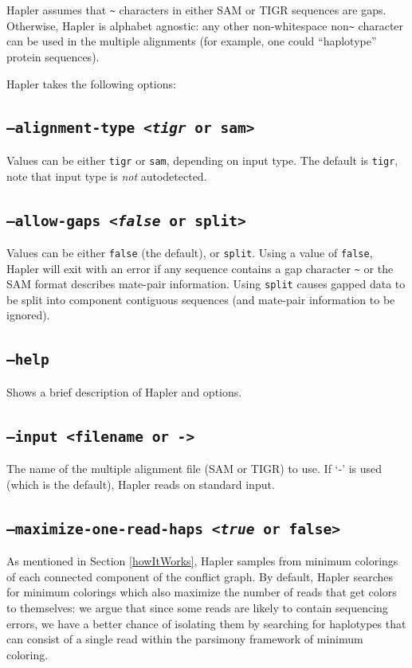 \documentclass[11pt]{llncs}
\begin{document}
Hapler assumes that \verb=~= characters in either SAM or TIGR sequences are gaps. Otherwise, Hapler is alphabet agnostic: any other non-whitespace
non\verb=~= character can be used in the multiple alignments (for example, one could ``haplotype'' protein sequences). 

Hapler takes the following options:

\subsection{\texttt{--alignment-type <\emph{tigr} or sam>}}

Values can be either \verb=tigr= or \verb=sam=, depending on input type. The default is \verb=tigr=, note that input type is \emph{not}
autodetected.

\subsection{\texttt{--allow-gaps <\emph{false} or split>}}

Values can be either \verb=false= (the default), or \verb=split=. Using a value of \verb=false=, Hapler will exit with an error
if any sequence contains a gap character \verb=~= or the SAM format describes mate-pair information. Using \verb=split= causes gapped data
to be split into component contiguous sequences (and mate-pair information to be ignored). 

\subsection{\texttt{--help}}

Shows a brief description of Hapler and options.

\subsection{\texttt{--input <filename or \emph{-}>}}

The name of the multiple alignment file (SAM or TIGR) to use. If `-' is used (which is the default), Hapler reads on standard input.

\subsection{\texttt{--maximize-one-read-haps <\emph{true} or false>}}

As mentioned in Section \ref{howItWorks}, Hapler samples from minimum colorings of each connected component of the conflict graph.
By default, Hapler searches for minimum colorings which also maximize the number of reads that get colors to themselves: we argue that
since some reads are likely to contain sequencing errors, we have a better chance of isolating them by searching for haplotypes that can 
consist of a single read within the parsimony framework of minimum coloring.
\end{document}
